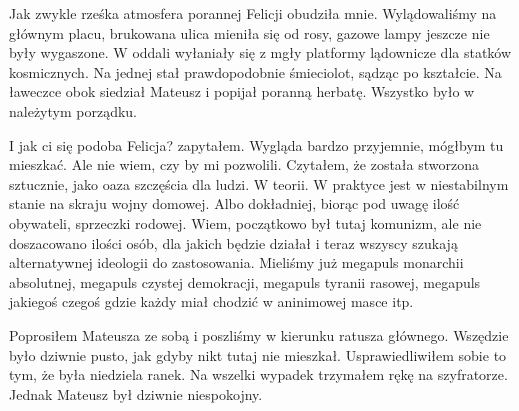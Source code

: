 Jak zwykle rześka atmosfera porannej Felicji obudziła mnie. 
Wylądowaliśmy na głównym placu, brukowana ulica mieniła się od rosy, gazowe lampy jeszcze nie były wygaszone.
W oddali wyłaniały się z mgły platformy lądownicze dla statków kosmicznych. Na jednej stał prawdopodobnie śmieciolot, sądząc po kształcie.
Na ławeczce obok siedział Mateusz i popijał poranną herbatę. 
Wszystko było w należytym porządku.
\begin{dialogue}
\ds{} I jak ci się podoba Felicja? \dm{} zapytałem.
\ds{} Wygląda bardzo przyjemnie, mógłbym tu mieszkać. Ale nie wiem, czy by mi pozwolili. Czytałem, że została stworzona sztucznie, jako oaza szczęścia dla ludzi.
\ds{} W teorii. W praktyce jest w niestabilnym stanie na skraju wojny domowej. Albo dokładniej, biorąc pod uwagę ilość obywateli, sprzeczki rodowej.
\ds{} Wiem, początkowo był tutaj komunizm, ale nie doszacowano ilości osób, dla jakich będzie działał i teraz wszyscy szukają alternatywnej ideologii do zastosowania.
\ds{} Mieliśmy już megapuls monarchii absolutnej, megapuls czystej demokracji, megapuls tyranii rasowej, megapuls jakiegoś czegoś gdzie każdy miał chodzić w aninimowej masce itp.
\end{dialogue}

Poprosiłem Mateusza ze sobą i poszliśmy w kierunku ratusza głównego.
Wszędzie było dziwnie pusto, jak gdyby nikt tutaj nie mieszkał. 
Usprawiedliwiłem sobie to tym, że była niedziela ranek.
Na wszelki wypadek trzymałem rękę na szyfratorze.
Jednak Mateusz był dziwnie niespokojny.

